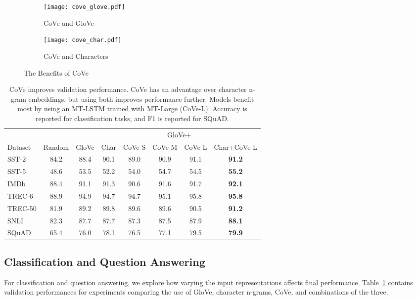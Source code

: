 \documentclass{article}
\begin{document}
\begin{figure}
\begin{subfigure}{0.48\textwidth}
\texttt{[image: cove\_glove.pdf]}\vspace{-0.2cm}
\caption{CoVe and GloVe} \label{fig:coveGloVe}
\end{subfigure}
\hspace*{\fill} \begin{subfigure}{0.48\textwidth}
\texttt{[image: cove\_char.pdf]}\vspace{-0.2cm}
\caption{CoVe and Characters} \label{fig:coveChar}
\end{subfigure}
\caption{The Benefits of CoVe} \label{fig:bars}
\end{figure}


\begin{table}
\captionsetup{width=.92\textwidth}
  \centering
\begin{tabular}{lccccccc}
\toprule
        &        &       & \multicolumn{5}{c}{GloVe+} \\
\cmidrule(lr){4-8}
Dataset & Random & GloVe & Char & CoVe-S & CoVe-M & CoVe-L & Char+CoVe-L \\
\midrule
SST-2   & 84.2 & 88.4 & 90.1 & 89.0 & 90.9 & 91.1 & \textbf{91.2}\\ 
SST-5   & 48.6 & 53.5 & 52.2 & 54.0 & 54.7 & 54.5 & \textbf{55.2}\\
IMDb    & 88.4 & 91.1 & 91.3 & 90.6 & 91.6 & 91.7 & \textbf{92.1}\\
TREC-6  & 88.9 & 94.9 & 94.7 & 94.7 & 95.1 & 95.8 & \textbf{95.8}\\ 
TREC-50 & 81.9 & 89.2 & 89.8 & 89.6 & 89.6 & 90.5 & \textbf{91.2}\\
SNLI    & 82.3 & 87.7 & 87.7 & 87.3 & 87.5 & 87.9 & \textbf{88.1}\\
SQuAD   & 65.4 & 76.0 & 78.1 & 76.5 & 77.1 & 79.5 & \textbf{79.9}\\
\bottomrule
  \end{tabular}
      \caption{CoVe improves validation performance. CoVe has an advantage over character n-gram embeddings, but using both improves performance further. Models benefit most by using an MT-LSTM trained with MT-Large (CoVe-L). Accuracy is reported for classification tasks, and F1 is reported for SQuAD.}
  \label{validationPerformance}
  \vspace{-0.8cm}
\end{table}
 
\subsection{Classification and Question Answering}
For classification and question answering, 
we explore how varying the input representations affects final performance.
Table~\ref{validationPerformance} contains validation performances for experiments comparing the use of GloVe, character n-grams, CoVe, and combinations of the three.
\end{document}
